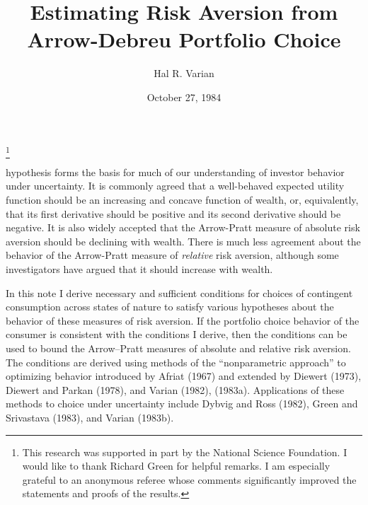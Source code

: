 \topmatter

\title{Estimating Risk Aversion from \cr 
     Arrow-Debreu Portfolio Choice}


\thanks{This research was supported in part by the National Science
Foundation.  I would like to thank Richard Green for helpful remarks.  I am
especially grateful to an anonymous referee whose comments significantly
improved the statements and proofs of the results.}

\author{Hal R. Varian}


\date{October 27, 1984}

\version{\today}




\address{Hal R. Varian, Department of Economics, University of Michigan, 
Ann Arbor, MI 48109}

\endtopmatter

\document

 hypothesis forms the basis for much
of our understanding of investor behavior under uncertainty.  It is
commonly agreed that a well-behaved expected utility function should be an
increasing and concave function of wealth, or, equivalently, that its first
derivative should be positive and its second derivative should be negative.
It is also widely accepted that the Arrow-Pratt measure of absolute risk
aversion should be declining with wealth.  There is much less agreement
about the behavior of the Arrow-Pratt measure of {\it relative\/} risk
aversion, although some investigators have argued that it should increase
with wealth.
  
In this note I derive necessary and sufficient conditions for choices of
contingent consumption across states of nature to satisfy various
hypotheses about the behavior of these measures of risk aversion.  If the
portfolio choice behavior of the consumer is consistent with the conditions
I derive, then the conditions can be used to bound the Arrow--Pratt
measures of absolute and relative risk aversion.   The conditions are
derived using methods of the ``nonparametric approach'' to optimizing
behavior introduced by Afriat (1967) and extended by Diewert (1973),
Diewert and Parkan (1978), and Varian (1982), (1983a).  Applications of
these methods to choice under uncertainty include Dybvig and Ross (1982),
Green and Srivastava (1983), and Varian (1983b).

